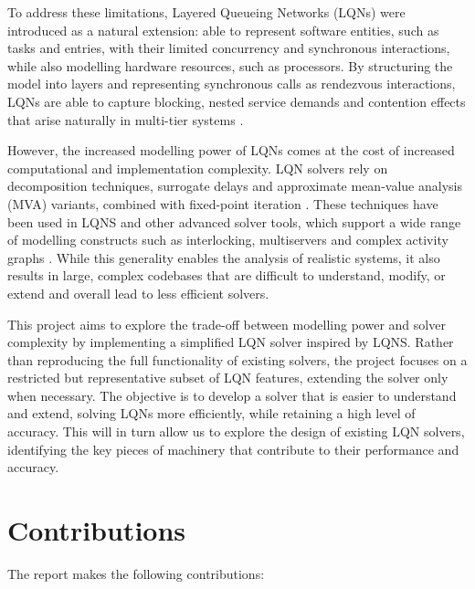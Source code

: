 To address these limitations, Layered Queueing Networks (LQNs) were introduced as a natural extension: able to represent software entities, such as tasks and entries, with their limited concurrency and synchronous interactions, while also modelling hardware resources, such as processors. By structuring the model into layers and representing synchronous calls as rendezvous interactions, LQNs are able to capture blocking, nested service demands and contention effects that arise naturally in multi-tier systems \cite{franks99, franks2009, woodside2002}.

However, the increased modelling power of LQNs comes at the cost of increased computational and implementation complexity. LQN solvers rely on decomposition techniques, surrogate delays and approximate mean-value analysis (MVA) variants, combined with fixed-point iteration \cite{lazowska84,franks99}. These techniques have been used in LQNS and other advanced solver tools, which support a wide range of modelling constructs such as interlocking, multiservers and complex activity graphs \cite{franks99}. While this generality enables the analysis of realistic systems, it also results in large, complex codebases that are difficult to understand, modify, or extend and overall lead to less efficient solvers.


This project aims to explore the trade-off between modelling power and solver complexity by implementing a simplified LQN solver inspired by LQNS. Rather than reproducing the full functionality of existing solvers, the project focuses on a restricted but representative subset of LQN features, extending the solver only when necessary. The objective is to develop a solver that is easier to understand and extend, solving LQNs more efficiently, while retaining a high level of accuracy. This will in turn allow us to explore the design of existing LQN solvers, identifying the key pieces of machinery that contribute to their performance and accuracy.


\section{Contributions}

The report makes the following contributions:

